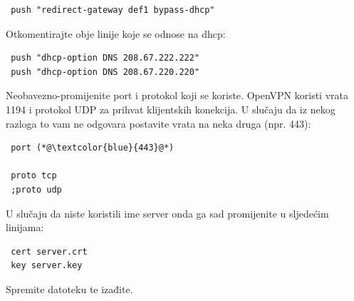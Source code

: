 \begin{lstlisting}
 push "redirect-gateway def1 bypass-dhcp"
\end{lstlisting}
Otkomentirajte obje linije koje se odnose na dhcp:
\begin{lstlisting}
 push "dhcp-option DNS 208.67.222.222"
 push "dhcp-option DNS 208.67.220.220"
\end{lstlisting}
Neobavezno-promijenite port i protokol koji se koriste. OpenVPN koristi vrata 1194 i protokol UDP za prihvat klijentskih konekcija. U slučaju da iz nekog razloga to vam ne odgovara postavite vrata na neka druga (npr. 443):
\begin{lstlisting}
 port (*@\textcolor{blue}{443}@*)
 
 proto tcp
 ;proto udp
\end{lstlisting}
U slučaju da niste koristili ime server onda ga sad promijenite u sljedećim linijama:
\begin{lstlisting}
 cert server.crt
 key server.key
\end{lstlisting}
Spremite datoteku te izađite.
\bigbreak
